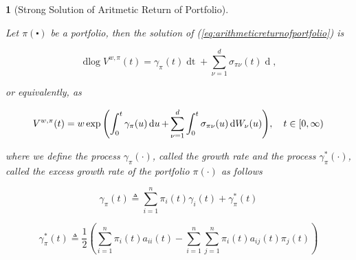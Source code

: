\documentclass[british]{amsart} \usepackage{lmodern}
\numberwithin{equation}{section} \numberwithin{figure}{section}
\theoremstyle{plain} \newtheorem{thm}{\protect\theoremname}[section]
\theoremstyle{definition} \newtheorem{defn}[thm]{\protect\definitionname}
\theoremstyle{plain} \newtheorem{assumption}[thm]{\protect\assumptionname}
\theoremstyle{plain} \newtheorem{lem}[thm]{\protect\lemmaname}
\theoremstyle{plain} \newtheorem{prop}[thm]{\protect\propositionname}
\theoremstyle{remark} \newtheorem{rem}[thm]{\protect\remarkname}
\theoremstyle{plain} \newtheorem{cor}[thm]{\protect\corollaryname}
\renewcommand{\d}[1]{\mathop{\mathrm{d}{#1}}}
\newcommand{\defeq}{\mathop{\triangleq}} \newcommand{\almostsurely}{\text{a.s.}}
\newcommand{\V}{V^{w,\pi}}
\begin{document}
\begin{prop} [Strong Solution of Aritmetic Return of Portfolio]
  \label{prop:solutionofarithmeticreturnofportfolio}

  Let $\pi(\centerdot)$ be a portfolio, then the solution of
  (\ref{eq:arithmeticreturnofportfolio}) is

  \begin{equation}
    \label{eq:solutionofarithmeticreturnofportfoliodiff}
    \d\log{\V(t)} =  
        \gamma_{\pi}(t) \d{t} +
        \sum_{\nu=1}^{d} \sigma_{\pi\nu}(t) \d{W_{\nu}(t)} ,
  \end{equation}

  or equivalently, as

  \begin{equation}
    \label{eq:solutionofarithmeticreturnofportfolio}
    \V(t) = w \exp{ 
      \left(
        \int_{0}^{t} \gamma_{\pi}(u) \d{u} +
        \sum_{\nu=1}^{d} \int_{0}^{t} \sigma_{\pi\nu}(u) \d{W_{\nu}(u)}
      \right)},
  \quad \ranget
  \end{equation}

  where we define the process $\gamma_{\pi}(\cdot)$, called the \textit{growth
  rate} and the process $\gamma_{\pi}^{*}(\cdot)$, called the \textit{excess
  growth rate} of the portfolio $\pi(\cdot)$ as follows

  \begin{equation}
    \label{eq:portfoliogrowthrate}
    \gamma_{\pi}(t) \defeq 
      \sum_{i=1}^{n} \pi_{i}(t)\gamma_{i}(t) + 
      \gamma_{\pi}^{*}(t)
  \end{equation}

  \begin{equation}
    \label{eq:portfolioexcessgrowthrate}
    \gamma_{\pi}^{*}(t) \defeq \frac{1}{2} 
        \left(
          \sum_{i=1}^{n} \pi_{i}(t)a_{ii}(t) -
          \sum_{i=1}^{n} \sum_{j=1}^{n} \pi_{i}(t)a_{ij}(t)\pi_{j}(t)
        \right)
  \end{equation}

\end{prop}
\end{document}
